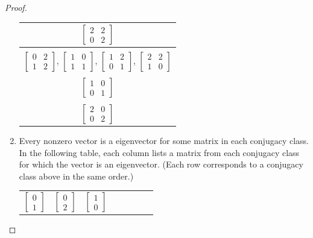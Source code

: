 \documentclass[12pt, psamsfonts]{amsart}
\theoremstyle{definition}
\theoremstyle{remark}
\numberwithin{equation}{section}
\begin{document}
\begin{proof}
\begin{enumerate}
\begin{center}
\begin{tabular}{|c|}
            $\begin{bmatrix} 2 & 2 \\ 0 & 2 \end{bmatrix}$ \\
          \hline \\
            $\begin{bmatrix} 0 & 2 \\ 1 & 2 \end{bmatrix}$,
            $\begin{bmatrix} 1 & 0 \\ 1 & 1 \end{bmatrix}$,
            $\begin{bmatrix} 1 & 2 \\ 0 & 1 \end{bmatrix}$,
            $\begin{bmatrix} 2 & 2 \\ 1 & 0 \end{bmatrix}$ \\
          \hline \\
            $\begin{bmatrix} 1 & 0 \\ 0 & 1 \end{bmatrix}$ \\
          \hline \\
            $\begin{bmatrix} 2 & 0 \\ 0 & 2 \end{bmatrix}$ \\
          \hline
        \end{tabular}
      \end{center}
    \item
      Every nonzero vector is a eigenvector for some matrix in each conjugacy class.
      In the following table, each column lists a matrix from each conjugacy class for which the vector is an eigenvector.
      (Each row corresponds to a conjugacy class above in the same order.)
      \begin{center}
        \begin{tabular}{|c|c|c|c|c|c|c|c|}
          $\begin{bmatrix} 0 \\ 1 \end{bmatrix}$
          & $\begin{bmatrix} 0 \\ 2 \end{bmatrix}$
          & $\begin{bmatrix} 1 \\ 0 \end{bmatrix}$

\end{tabular}
\end{center}
\end{enumerate}
\end{proof}
\end{document}
